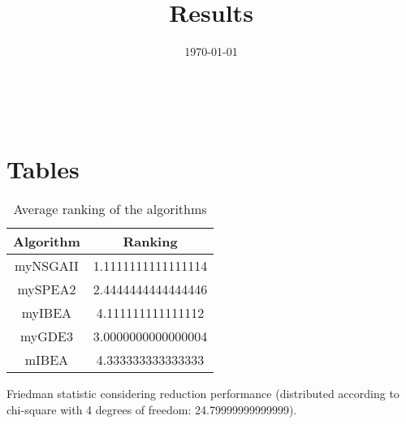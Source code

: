\documentclass{article}
\title{Results}
\author{}
\date{\today}
\begin{document}
\oddsidemargin 0in \topmargin 0in\maketitle
\
\section{Tables}
\begin{table}[!htp]
\centering
\caption{Average ranking of the algorithms}
\begin{tabular}{c|c}
Algorithm&Ranking\\
\hline
myNSGAII&1.1111111111111114\\
mySPEA2&2.4444444444444446\\
myIBEA&4.111111111111112\\
myGDE3&3.0000000000000004\\
mIBEA&4.333333333333333\\
\end{tabular}
\end{table}


Friedman statistic considering reduction performance (distributed according to chi-square with 4 degrees of freedom: 24.79999999999999).
\end{document}
